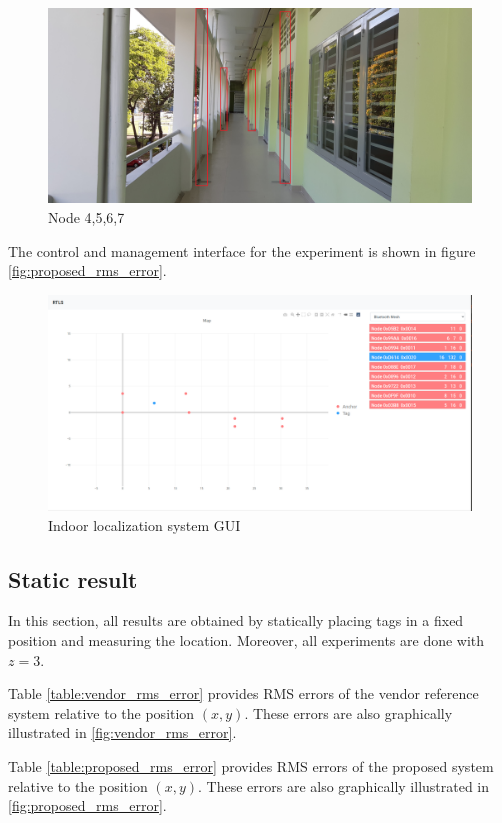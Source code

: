 \documentclass[\main/main.tex]{subfiles}
\begin{document}
\begin{figure}[H]      
    \centering
    \includegraphics[width=1\textwidth]{arena_03.jpg}
    \caption{Node 4,5,6,7}
    \label{fig:node_4_5_6_7}
\end{figure}

The control and management interface for the experiment is shown in figure \ref{fig:proposed_rms_error}.
\begin{figure}[H]   
    \centering
    \includegraphics[width=1\textwidth]{result_gui.png}
    \caption{Indoor localization system GUI}
    \label{fig:result_gui}
\end{figure}

\subsection{Static result}
In this section, all results are obtained by statically placing tags in a fixed position and measuring the location. Moreover, all experiments are done with $z=3$.

Table \ref{table:vendor_rms_error} provides RMS errors of the vendor reference system relative to the position $(x,y)$. These errors are also graphically illustrated in \ref{fig:vendor_rms_error}.

Table \ref{table:proposed_rms_error} provides RMS errors of the proposed system relative to the position $(x,y)$. These errors are also graphically illustrated in \ref{fig:proposed_rms_error}.
\end{document}
